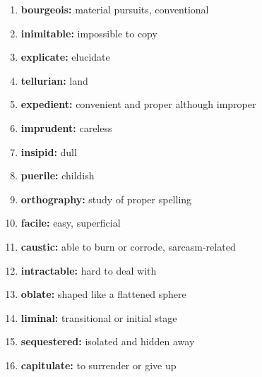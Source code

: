 \documentclass{article}
\begin{document}
\begin{enumerate}
    \item \textbf{bourgeois: }{material pursuits, conventional}
    \item \textbf{inimitable: }{impossible to copy}
    \item \textbf{explicate: }{elucidate}
    \item \textbf{tellurian: }{land}
    \item \textbf{expedient: }{convenient and proper although improper}
    \item \textbf{imprudent: }{careless}
    \item \textbf{insipid: }{dull}
    \item \textbf{puerile: }{childish}
    \item \textbf{orthography: }{study of proper spelling}
    \item \textbf{facile: }{easy, superficial}
    \item \textbf{caustic: }{able to burn or corrode, sarcasm-related}
    \item \textbf{intractable: }{hard to deal with}
    \item \textbf{oblate: }{shaped like a flattened sphere}
    \item \textbf{liminal: }{transitional or initial stage}
    \item \textbf{sequestered: }{isolated and hidden away}
    \item \textbf{capitulate: }{to surrender or give up}
    
\end{enumerate}
\end{document}
